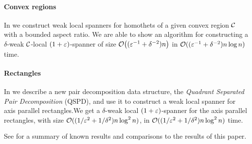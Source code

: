 \documentclass[12pt]{article}%
\begin{document}
\paragraph{Convex regions}
In  we construct weak local spanners for
homothets of a given convex region $\mathcal{C}$ with a bounded aspect
ratio. We are able to show an algorithm for constructing a
$\delta$-weak $\mathcal{C}$-local $(1+\varepsilon)$-spanner of size
$\mathcal{O}\bigl( (\varepsilon^{-1} + \delta^{-2}) n \bigr) $ in
$\mathcal{O}( (\varepsilon^{-1} + \delta^{-2}) n \log n)$ time.


\paragraph{Rectangles}
In  we describe a new pair decomposition data
structure, the \emph{Quadrant Separated Pair Decomposition} (QSPD),
and use it to construct a weak local spanner for axis parallel
rectangles.We get a $\delta$-weak local $(1+\varepsilon)$-spanner for the
axis parallel rectangles, with size
$\mathcal{O}((1/\varepsilon^2 + 1/\delta^2) n \log^2 n)$, in
$\mathcal{O}((1/\varepsilon^2 + 1/\delta^2) n \log^2 n)$ time.

See  for a summary of known results and
comparisons to the results of this paper.
\end{document}
